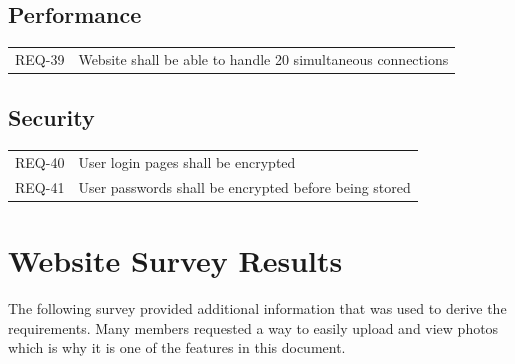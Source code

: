 \documentclass{article}
\newcommand{\req}[1]{REQ-{#1}}
\begin{document}
\subsection{Performance}

\begin{tabular}{lp{8cm}}
\req{39} & Website shall be able to handle 20 simultaneous connections\\
\end{tabular}

\subsection{Security}

\begin{tabular}{lp{8cm}}
\req{40} & User login pages shall be encrypted\\
\req{41} & User passwords shall be encrypted before being stored\\
\end{tabular}

\appendix
\section{Website Survey Results}
The following survey provided additional information that was used to
derive the requirements. Many members requested a way to easily upload
and view photos which is why it is one of the features in this document.


\end{document}
